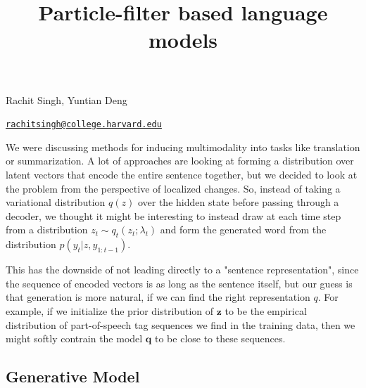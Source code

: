 \documentclass[12pt]{article}
\title{\large Particle-filter based language models\vspace{-0.5in}} %
\theoremstyle{definition}
\theoremstyle{remark}
\renewcommand{\v}[1]{\mathbf{#1}}
\begin{document}
\maketitle

\vspace*{-0.25in}
\centerline{Rachit Singh, Yuntian Deng}
\centerline{\href{mailto:rachitsingh@college.harvard.edu}{{\tt rachitsingh@college.harvard.edu}}}
\vspace*{0.15in}
\medskip

We were discussing methods for inducing multimodality into tasks like translation or summarization. A lot of approaches are looking at forming a distribution over latent vectors that encode the entire sentence together, but we decided to look at the problem from the perspective of localized changes. So, instead of taking a variational distribution $q(z)$ over the hidden state before passing through a decoder, we thought it might be interesting to instead draw at each time step from a distribution $z_t \sim q_t(z_t; \lambda_t)$ and form the generated word from the distribution $p(y_t | z, y_{1:t-1})$. 

\smallskip

This has the downside of not leading directly to a "sentence representation", since the sequence of encoded vectors is as long as the sentence itself, but our guess is that generation is more natural, if we can find the right representation $q$. For example, if we initialize the prior distribution of $\v z$ to be the empirical distribution of part-of-speech tag sequences we find in the training data, then we might softly contrain the model $\v q$ to be close to these sequences.

\subsection*{Generative Model}
\end{document}
